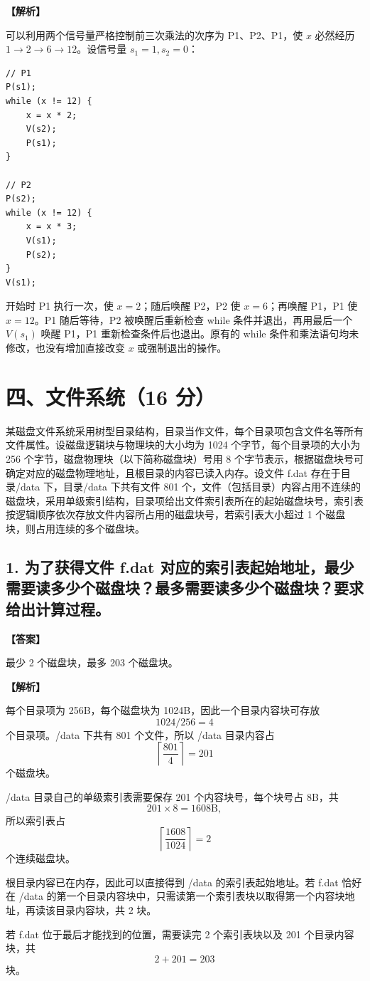 \documentclass[UTF8,12pt]{ctexart}
\newenvironment{explanation}{\par\noindent\textbf{【解析】}\par\smallskip}{\par\medskip}
\newenvironment{answer}{\par\noindent\textbf{【答案】}\par\smallskip}{\par}
\begin{document}
\begin{explanation}
可以利用两个信号量严格控制前三次乘法的次序为 P1、P2、P1，使 $x$ 必然经历 $1\to2\to6\to12$。设信号量 $s_1=1,s_2=0$：

\begin{lstlisting}
// P1
P(s1);
while (x != 12) {
    x = x * 2;
    V(s2);
    P(s1);
}

// P2
P(s2);
while (x != 12) {
    x = x * 3;
    V(s1);
    P(s2);
}
V(s1);
\end{lstlisting}

开始时 P1 执行一次，使 $x=2$；随后唤醒 P2，P2 使 $x=6$；再唤醒 P1，P1 使 $x=12$。P1 随后等待，P2 被唤醒后重新检查 while 条件并退出，再用最后一个 $V(s_1)$ 唤醒 P1，P1 重新检查条件后也退出。原有的 while 条件和乘法语句均未修改，也没有增加直接改变 $x$ 或强制退出的操作。
\end{explanation}
\section*{四、文件系统（16 分）}
某磁盘文件系统采用树型目录结构，目录当作文件，每个目录项包含文件名等所有文件属性。设磁盘逻辑块与物理块的大小均为 1024 个字节，每个目录项的大小为 256 个字节，磁盘物理块（以下简称磁盘块）号用 8 个字节表示，根据磁盘块号可确定对应的磁盘物理地址，且根目录的内容已读入内存。设文件 f.dat 存在于目录/data 下，目录/data 下共有文件 801 个，文件（包括目录）内容占用不连续的磁盘块，采用单级索引结构，目录项给出文件索引表所在的起始磁盘块号，索引表按逻辑顺序依次存放文件内容所占用的磁盘块号，若索引表大小超过 1 个磁盘块，则占用连续的多个磁盘块。

\subsection*{1. 为了获得文件 f.dat 对应的索引表起始地址，最少需要读多少个磁盘块？最多需要读多少个磁盘块？要求给出计算过程。}
\begin{answer}
最少 2 个磁盘块，最多 203 个磁盘块。
\end{answer}

\begin{explanation}
每个目录项为 256B，每个磁盘块为 1024B，因此一个目录内容块可存放
\[
1024/256=4
\]
个目录项。/data 下共有 801 个文件，所以 /data 目录内容占
\[
\left\lceil\frac{801}{4}\right\rceil=201
\]
个磁盘块。

/data 目录自己的单级索引表需要保存 201 个内容块号，每个块号占 8B，共
\[
201\times8=1608\text{B},
\]
所以索引表占
\[
\left\lceil\frac{1608}{1024}\right\rceil=2
\]
个连续磁盘块。

根目录内容已在内存，因此可以直接得到 /data 的索引表起始地址。若 f.dat 恰好在 /data 的第一个目录内容块中，只需读第一个索引表块以取得第一个内容块地址，再读该目录内容块，共 2 块。

若 f.dat 位于最后才能找到的位置，需要读完 2 个索引表块以及 201 个目录内容块，共
\[
2+201=203
\]
块。
\end{explanation}
\end{document}
